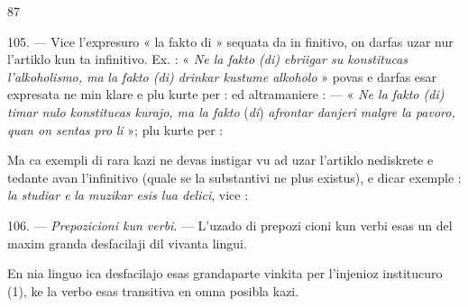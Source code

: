 \begin{VUpage}[91]{87}

105. --- Vice l'expresuro « la fakto di » sequata da in\cc
finitivo, on darfas uzar nur l'artiklo kun ta infinitivo. Ex. :\nl
« \textit{Ne la fakto (di) ebriigar su konstitucas l'alkoholismo, ma}\nl
\textit{la fakto (di) drinkar kustume alkoholo} » povas e darfas esar\nl
expresata ne min klare e plu kurte per : \nl
{}\nl
ed altramaniere : \nl
{} --- \nl
« \textit{Ne la fakto (di) timar nulo konstitucas kurajo, ma la fakto}\nl
(\textit{di}) \textit{afrontar danjeri malgre la pavoro, quan on sentas pro}\nl
\textit{li} »; plu kurte per : \nl
{}\nl
{}

Ma ca exempli di rara kazi ne devas instigar vu ad uzar\nl
l'artiklo nediskrete e tedante avan l'infinitivo (quale se la\nl
substantivi ne plus existus), e dicar exemple : \textit{la studiar e}\nl
\textit{la muzikar esis lua delici}, vice : \nl
{}

\VUblanc{5.57pt}%
106. --- \textit{Prepozicioni kun verbi}. --- L'uzado di prepozi\cc
cioni kun verbi esas un del maxim granda desfacilaji dil\nl
vivanta lingui.

En nia linguo ica desfacilajo esas grandaparte vinkita\nl
per l'injenioz institucuro (1), ke la verbo esas transitiva\nl
en omna posibla kazi.


\end{VUpage}
